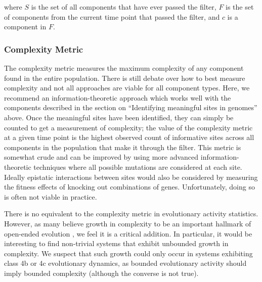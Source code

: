 \documentclass[letterpaper]{article}
\begin{document}
where $S$ is the set of all components that have ever passed the filter, $F$ is the set of components from the current time point that passed the filter, and $c$ is a component in $F$.

\subsubsection{Complexity Metric}
The complexity metric measures the maximum complexity of any component found in the entire population. There is still debate over how to best measure complexity and not all approaches are viable for all component types. Here, we recommend an information-theoretic approach which works well with the components described in the section on ``Identifying meaningful sites in genomes'' above. Once the meaningful sites have been identified, they can simply be counted to get a measurement of complexity; the value of the complexity metric at a given time point is the highest observed count of informative sites across all components in the population that make it through the filter. This metric is somewhat crude and can be improved by using more advanced information-theoretic techniques where all possible mutations are considered at each site. Ideally epistatic interactions between sites would also be considered by measuring the fitness effects of knocking out combinations of genes. Unfortunately, doing so is often not viable in practice.

There is no equivalent to the complexity metric in evolutionary activity statistics. However, as many believe growth in complexity to be an important hallmark of open-ended evolution \citep{taylor_open-ended_2016}, we feel it is a critical addition. In particular, it would be interesting to find non-trivial systems that exhibit unbounded growth in complexity. We suspect that such growth could only occur in systems exhibiting class 4b or 4c evolutionary dynamics, as bounded evolutionary activity should imply bounded complexity (although the converse is not true).
\end{document}
